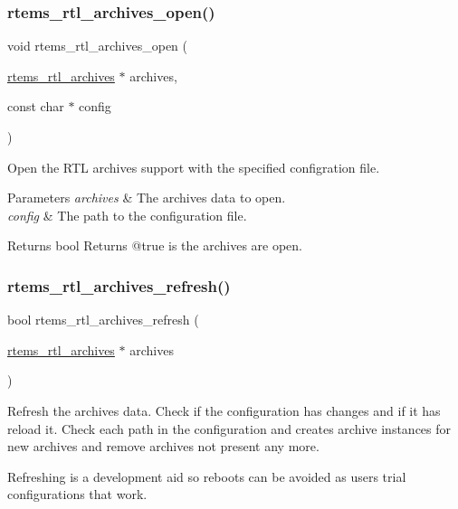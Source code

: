 \subsubsection{\texorpdfstring{rtems\_rtl\_archives\_open()}{rtems\_rtl\_archives\_open()}}
{\footnotesize\ttfamily void rtems\+\_\+rtl\+\_\+archives\+\_\+open (\begin{DoxyParamCaption}\item[{\mbox{\hyperlink{structrtems__rtl__archives}{rtems\+\_\+rtl\+\_\+archives}} $\ast$}]{archives,  }\item[{const char $\ast$}]{config }\end{DoxyParamCaption})}

Open the R\+TL archives support with the specified configration file.


\begin{DoxyParams}{Parameters}
{\em archives} & The archives data to open. \\
\hline
{\em config} & The path to the configuration file. \\
\hline
\end{DoxyParams}
\begin{DoxyReturn}{Returns}
bool Returns @true is the archives are open. 
\end{DoxyReturn}
\mbox{\label{rtl-archive_8h_ad357ba19c50eb2c554a8ef8bbd1baa74}} 
\subsubsection{\texorpdfstring{rtems\_rtl\_archives\_refresh()}{rtems\_rtl\_archives\_refresh()}}
{\footnotesize\ttfamily bool rtems\+\_\+rtl\+\_\+archives\+\_\+refresh (\begin{DoxyParamCaption}\item[{\mbox{\hyperlink{structrtems__rtl__archives}{rtems\+\_\+rtl\+\_\+archives}} $\ast$}]{archives }\end{DoxyParamCaption})}

Refresh the archives data. Check if the configuration has changes and if it has reload it. Check each path in the configuration and creates archive instances for new archives and remove archives not present any more.

Refreshing is a development aid so reboots can be avoided as users trial configurations that work.


